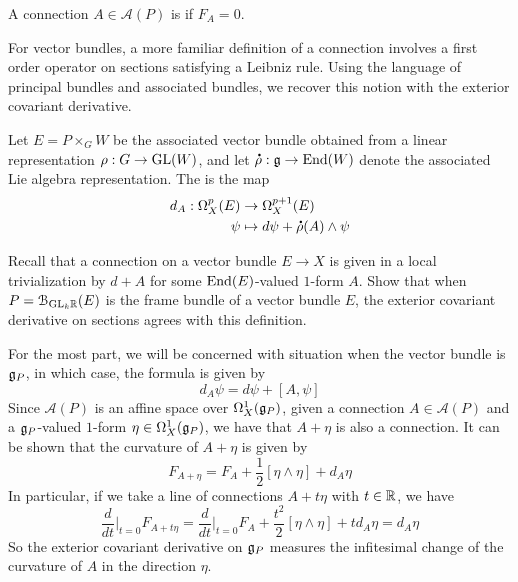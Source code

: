 %
\begin{defn}
A connection $A \in \mathscr{A}(P)$ is  if $F_A = 0$.
\end{defn}
%
For vector bundles, a more familiar definition of a connection involves
a first order operator on sections satisfying a Leibniz rule. Using
the language of principal bundles and associated bundles, we recover
this notion with the exterior covariant derivative.
%
\begin{defn}
Let $E = P\times_G W$ be the associated vector bundle obtained from a
linear representation $\rho : G \to \mathrm{GL}(W)$, and let $\accentset{\mbox{\large\bfseries .}}{\rho} : \mathfrak{g} \to \operatorname{End}(W)$
denote the associated Lie algebra representation. The 
is the map
\begin{align*}
d_A : \Omega^p_X(E) &\to \Omega^{p+1}_X(E) \\
\psi &\mapsto d\psi + \accentset{\mbox{\large\bfseries .}}{\rho}(A) \wedge \psi
\end{align*}
\end{defn}
%
\begin{exer}
Recall that a connection on a vector bundle $E \to X$ is given in a local
trivialization by $d + A$ for some $\operatorname{End}(E)$-valued $1$-form $A$.
Show that when $P = \mathcal{B}_{\mathrm{GL}_k\mathbb{R}}(E)$ is the frame bundle of a vector
bundle $E$, the exterior covariant derivative on sections agrees with
this definition.
\end{exer}
%
For the most part, we will be concerned with situation when the vector
bundle is $\mathfrak{g}_P$, in which case, the formula is given by
\[
d_A\psi = d\psi + [A,\psi]
\]
Since $\mathscr{A}(P)$ is an affine space over $\Omega^1_X(\mathfrak{g}_P)$, given
a connection $A \in \mathscr{A}(P)$ and a $\mathfrak{g}_P$-valued $1$-form
$\eta \in \Omega^1_X(\mathfrak{g}_P)$, we have that $A + \eta$ is also a connection.
It can be shown that the curvature of $A+\eta$ is given by
\[
F_{A + \eta} = F_A + \frac{1}{2}[\eta\wedge\eta] + d_A\eta
\]
In particular, if we take a line of connections $A + t\eta$ with $t \in \mathbb{R}$,
we have
\[
\frac{d}{dt}\bigg\vert_{t=0}F_{A+t\eta}
= \frac{d}{dt}\bigg\vert_{t=0}F_A + \frac{t^2}{2}[\eta\wedge\eta] + td_A\eta
= d_A\eta
\]
So the exterior covariant derivative on $\mathfrak{g}_P$ measures the infitesimal
change of the curvature of $A$ in the direction $\eta$.
%